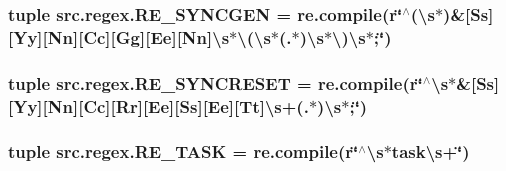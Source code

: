 \hypertarget{namespacesrc_1_1regex_af5c8c0471bd63f5415e88d433272434b}{
\subsubsection[{R\-E\-\_\-\-S\-Y\-N\-C\-G\-E\-N}]{\setlength{\rightskip}{0pt plus 5cm}tuple src.\-regex.\-R\-E\-\_\-\-S\-Y\-N\-C\-G\-E\-N = re.\-compile(r\char`\"{}$^\wedge$(\textbackslash{}s$\ast$)\&\mbox{[}Ss\mbox{]}\mbox{[}Yy\mbox{]}\mbox{[}Nn\mbox{]}\mbox{[}Cc\mbox{]}\mbox{[}Gg\mbox{]}\mbox{[}Ee\mbox{]}\mbox{[}Nn\mbox{]}\textbackslash{}s$\ast$\textbackslash{}(\textbackslash{}s$\ast$(.$\ast$)\textbackslash{}s$\ast$\textbackslash{})\textbackslash{}s$\ast$;\char`\"{})}}\label{namespacesrc_1_1regex_af5c8c0471bd63f5415e88d433272434b}
\hypertarget{namespacesrc_1_1regex_ac076693881cddcb390503594ef4003d0}{
\subsubsection[{R\-E\-\_\-\-S\-Y\-N\-C\-R\-E\-S\-E\-T}]{\setlength{\rightskip}{0pt plus 5cm}tuple src.\-regex.\-R\-E\-\_\-\-S\-Y\-N\-C\-R\-E\-S\-E\-T = re.\-compile(r\char`\"{}$^\wedge$\textbackslash{}s$\ast$\&\mbox{[}Ss\mbox{]}\mbox{[}Yy\mbox{]}\mbox{[}Nn\mbox{]}\mbox{[}Cc\mbox{]}\mbox{[}Rr\mbox{]}\mbox{[}Ee\mbox{]}\mbox{[}Ss\mbox{]}\mbox{[}Ee\mbox{]}\mbox{[}Tt\mbox{]}\textbackslash{}s+(.$\ast$)\textbackslash{}s$\ast$;\char`\"{})}}\label{namespacesrc_1_1regex_ac076693881cddcb390503594ef4003d0}
\hypertarget{namespacesrc_1_1regex_ae47cd46c8489265ed1c4301740816b21}{
\subsubsection[{R\-E\-\_\-\-T\-A\-S\-K}]{\setlength{\rightskip}{0pt plus 5cm}tuple src.\-regex.\-R\-E\-\_\-\-T\-A\-S\-K = re.\-compile(r\char`\"{}$^\wedge$\textbackslash{}s$\ast$task\textbackslash{}s+\char`\"{})}}\label{namespacesrc_1_1regex_ae47cd46c8489265ed1c4301740816b21}
